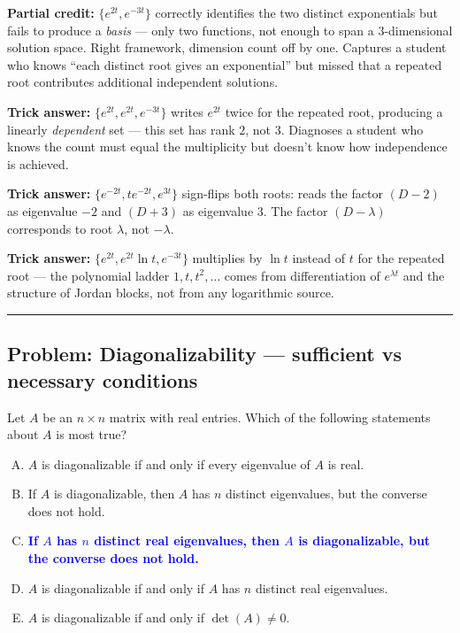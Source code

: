 \documentclass[12pt]{amsart}
\newcommand{\divider}{
  \vspace{-1em}
  \noindent
  \raisebox{-0.15ex}{\textbullet}%
  \hspace{0.5em}%
  \rule[0.5ex]{0.95\textwidth}{1.0pt}%
  \hspace{0.5em}%
  \raisebox{-0.15ex}{\textbullet}%
  \vspace{0em}
}
\begin{document}
\textbf{Partial credit:}
$\{e^{2t}, e^{-3t}\}$ correctly identifies the two distinct exponentials
but fails to produce a \emph{basis} --- only two functions, not enough to
span a $3$-dimensional solution space. Right framework, dimension count
off by one. Captures a student who knows ``each distinct root gives an
exponential'' but missed that a repeated root contributes additional
independent solutions.

\textbf{Trick answer:}
$\{e^{2t}, e^{2t}, e^{-3t}\}$ writes $e^{2t}$ twice for the repeated root,
producing a linearly \emph{dependent} set --- this set has rank $2$, not
$3$. Diagnoses a student who knows the count must equal the multiplicity
but doesn't know how independence is achieved.

\textbf{Trick answer:}
$\{e^{-2t}, t e^{-2t}, e^{3t}\}$ sign-flips both roots: reads the factor
$(D - 2)$ as eigenvalue $-2$ and $(D + 3)$ as eigenvalue $3$. The factor
$(D - \lambda)$ corresponds to root $\lambda$, not $-\lambda$.

\textbf{Trick answer:}
$\{e^{2t}, e^{2t} \ln t, e^{-3t}\}$ multiplies by $\ln t$ instead of $t$
for the repeated root --- the polynomial ladder $1, t, t^2, \ldots$ comes
from differentiation of $e^{\lambda t}$ and the structure of Jordan blocks,
not from any logarithmic source.

\divider

\subsection*{Problem: Diagonalizability --- sufficient vs necessary conditions}

Let $A$ be an $n \times n$ matrix with real entries. Which of the following
statements about $A$ is most true?

\begin{enumerate}[(A)]
\item $A$ is diagonalizable if and only if every eigenvalue of $A$ is real.
\item If $A$ is diagonalizable, then $A$ has $n$ distinct eigenvalues, but the converse does not hold.
\item \textcolor{blue}{\textbf{If $A$ has $n$ distinct real eigenvalues, then $A$ is diagonalizable, but the converse does not hold.}}
\item $A$ is diagonalizable if and only if $A$ has $n$ distinct real eigenvalues.
\item $A$ is diagonalizable if and only if $\det(A) \neq 0$.
\end{enumerate}
\end{document}
